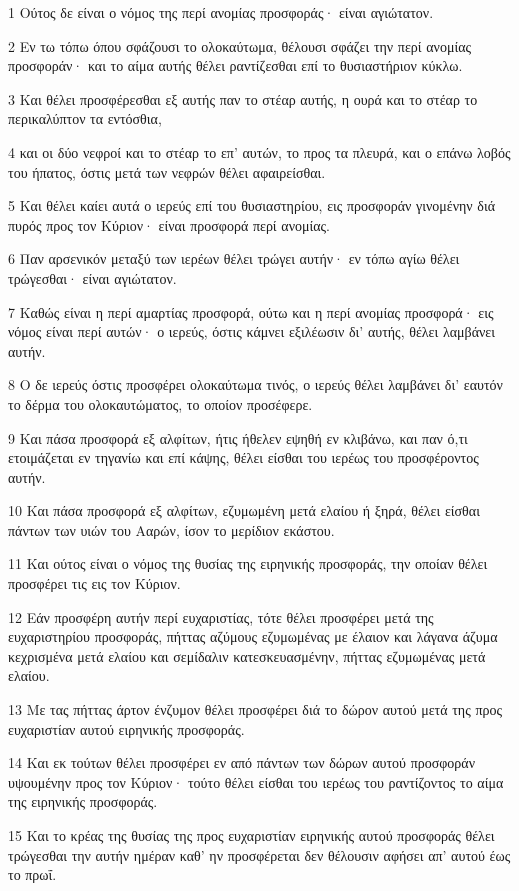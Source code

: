 \par 1 Ούτος δε είναι ο νόμος της περί ανομίας προσφοράς· είναι αγιώτατον.
\par 2 Εν τω τόπω όπου σφάζουσι το ολοκαύτωμα, θέλουσι σφάζει την περί ανομίας προσφοράν· και το αίμα αυτής θέλει ραντίζεσθαι επί το θυσιαστήριον κύκλω.
\par 3 Και θέλει προσφέρεσθαι εξ αυτής παν το στέαρ αυτής, η ουρά και το στέαρ το περικαλύπτον τα εντόσθια,
\par 4 και οι δύο νεφροί και το στέαρ το επ' αυτών, το προς τα πλευρά, και ο επάνω λοβός του ήπατος, όστις μετά των νεφρών θέλει αφαιρείσθαι.
\par 5 Και θέλει καίει αυτά ο ιερεύς επί του θυσιαστηρίου, εις προσφοράν γινομένην διά πυρός προς τον Κύριον· είναι προσφορά περί ανομίας.
\par 6 Παν αρσενικόν μεταξύ των ιερέων θέλει τρώγει αυτήν· εν τόπω αγίω θέλει τρώγεσθαι· είναι αγιώτατον.
\par 7 Καθώς είναι η περί αμαρτίας προσφορά, ούτω και η περί ανομίας προσφορά· εις νόμος είναι περί αυτών· ο ιερεύς, όστις κάμνει εξιλέωσιν δι' αυτής, θέλει λαμβάνει αυτήν.
\par 8 Ο δε ιερεύς όστις προσφέρει ολοκαύτωμα τινός, ο ιερεύς θέλει λαμβάνει δι' εαυτόν το δέρμα του ολοκαυτώματος, το οποίον προσέφερε.
\par 9 Και πάσα προσφορά εξ αλφίτων, ήτις ήθελεν εψηθή εν κλιβάνω, και παν ό,τι ετοιμάζεται εν τηγανίω και επί κάψης, θέλει είσθαι του ιερέως του προσφέροντος αυτήν.
\par 10 Και πάσα προσφορά εξ αλφίτων, εζυμωμένη μετά ελαίου ή ξηρά, θέλει είσθαι πάντων των υιών του Ααρών, ίσον το μερίδιον εκάστου.
\par 11 Και ούτος είναι ο νόμος της θυσίας της ειρηνικής προσφοράς, την οποίαν θέλει προσφέρει τις εις τον Κύριον.
\par 12 Εάν προσφέρη αυτήν περί ευχαριστίας, τότε θέλει προσφέρει μετά της ευχαριστηρίου προσφοράς, πήττας αζύμους εζυμωμένας με έλαιον και λάγανα άζυμα κεχρισμένα μετά ελαίου και σεμίδαλιν κατεσκευασμένην, πήττας εζυμωμένας μετά ελαίου.
\par 13 Με τας πήττας άρτον ένζυμον θέλει προσφέρει διά το δώρον αυτού μετά της προς ευχαριστίαν αυτού ειρηνικής προσφοράς.
\par 14 Και εκ τούτων θέλει προσφέρει εν από πάντων των δώρων αυτού προσφοράν υψουμένην προς τον Κύριον· τούτο θέλει είσθαι του ιερέως του ραντίζοντος το αίμα της ειρηνικής προσφοράς.
\par 15 Και το κρέας της θυσίας της προς ευχαριστίαν ειρηνικής αυτού προσφοράς θέλει τρώγεσθαι την αυτήν ημέραν καθ' ην προσφέρεται δεν θέλουσιν αφήσει απ' αυτού έως το πρωΐ.
